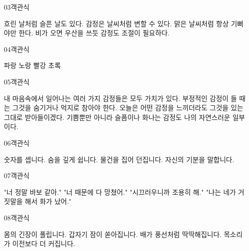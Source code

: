 \documentclass[fs13,seriesSau]{korfarm-base}
\begin{document}
\begin{kfQBlock}{03}{객관식}
\begin{kfChoices}
\kfChoice 흐린 날처럼 슬픈 날도 있다.
\kfChoice 감정은 날씨처럼 변할 수 있다.
\kfChoice 맑은 날씨처럼 항상 기뻐야만 한다.
\kfChoice 비가 오면 우산을 쓰듯 감정도 조절이 필요하다.
\end{kfChoices}
\end{kfQBlock}

\begin{kfQBlock}{04}{객관식}
\begin{kfChoices}
\kfChoice 파랑
\kfChoice 노랑
\kfChoice 빨강
\kfChoice 초록
\end{kfChoices}
\end{kfQBlock}

\begin{kfQBlock}{05}{객관식}
\begin{kfChoices}
\kfChoice 내 마음속에서 일어나는 여러 가지 감정들은 모두 가치가 있다.
\kfChoice 부정적인 감정이 들 때는 그것을 숨기거나 억지로 참아야 한다.
\kfChoice 오늘은 어떤 감정을 느끼더라도 그것을 있는 그대로 받아들이겠다.
\kfChoice 기쁨뿐만 아니라 슬픔이나 화나는 감정도 나의 자연스러운 일부이다.
\end{kfChoices}
\end{kfQBlock}

\begin{kfQBlock}{06}{객관식}
\begin{kfChoices}
\kfChoice 숫자를 셉니다.
\kfChoice 숨을 깊게 쉽니다.
\kfChoice 물건을 집어 던집니다.
\kfChoice 자신의 기분을 말합니다.
\end{kfChoices}
\end{kfQBlock}

\begin{kfQBlock}{07}{객관식}
\begin{kfChoices}
\kfChoice "너 정말 바보 같아."
\kfChoice "너 때문에 다 망쳤어."
\kfChoice "시끄러우니까 조용히 해."
\kfChoice "나는 네가 거짓말을 해서 화가 났어."
\end{kfChoices}
\end{kfQBlock}

\begin{kfQBlock}{08}{객관식}
\begin{kfChoices}
\kfChoice 몸의 긴장이 풀립니다.
\kfChoice 갑자기 잠이 쏟아집니다.
\kfChoice 배가 풍선처럼 딱딱해집니다.
\kfChoice 목소리가 이전보다 더 커집니다.
\end{kfChoices}
\end{kfQBlock}
\end{document}
